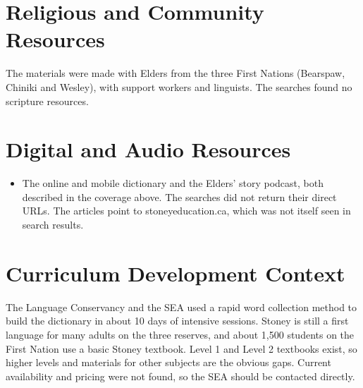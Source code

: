 \documentclass[12pt]{article}
\begin{document}
\section{Religious and Community Resources}
The materials were made with Elders from the three First Nations (Bearspaw, Chiniki and Wesley), with support workers and linguists. The searches found no scripture resources.

\section{Digital and Audio Resources}
\begin{itemize}
\item The online and mobile dictionary and the Elders' story podcast, both described in the coverage above. The searches did not return their direct URLs. The articles point to stoneyeducation.ca, which was not itself seen in search results.
\end{itemize}

\section{Curriculum Development Context}
The Language Conservancy and the SEA used a rapid word collection method to build the dictionary in about 10 days of intensive sessions. Stoney is still a first language for many adults on the three reserves, and about 1,500 students on the First Nation use a basic Stoney textbook. Level 1 and Level 2 textbooks exist, so higher levels and materials for other subjects are the obvious gaps. Current availability and pricing were not found, so the SEA should be contacted directly.
\end{document}
